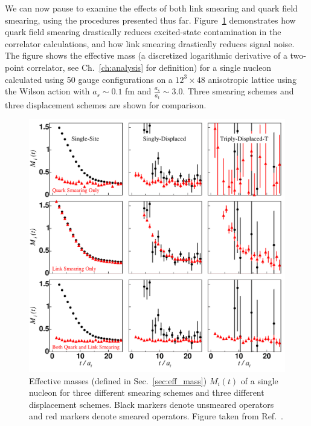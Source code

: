     We can now pause to examine the effects of both link smearing and quark field smearing, using the procedures presented thus far. Figure~\ref{fig:meff-smearing} demonstrates how quark field smearing drastically reduces excited-state contamination in the correlator calculations, and how link smearing drastically reduces signal noise. The figure shows the effective mass (a discretized logarithmic derivative of a two-point correlator, see Ch.~\ref{ch:analysis} for definition) for a single nucleon calculated using 50 gauge configurations on a $12^3\times48$ anisotropic lattice using the Wilson action with $a_s \sim 0.1$ fm and $\frac{a_s}{a_t} \sim 3.0$. Three smearing schemes and three displacement schemes are shown for comparison.
    \begin{figure}
        \centering
        \includegraphics[scale=0.8]{figures/meff-smearing.pdf}
        \caption{Effective masses (defined in Sec.~\ref{sec:eff_mass}) $M_i(t)$ of a single nucleon for three different smearing schemes and three different displacement schemes. Black markers denote unsmeared operators and red markers denote smeared operators. Figure taken from Ref.~\cite{spectroscopy}.}\label{fig:meff-smearing}
    \end{figure}
    
